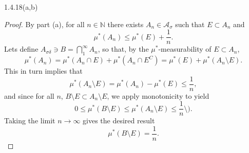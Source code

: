 \documentclass[11pt]{article}
\begin{document}
\begin{problem}{1.4.18(a,b)}
\begin{enumerate}[label=(\alph*)]
\begin{proof}
			      By part (a), for all \( n \in \mathbb{N} \) there exists \( A_n \in \mathcal{A}_{\sigma} \) such that \( E \subset A_n \) and
			      \begin{equation}
				      \label{eq:8}
				      \mu^{*}(A_n) \leq \mu^{*}(E) + \frac{1}{n}.
			      \end{equation}
			      Lets define \( A_{\sigma\delta} \ni B = \bigcap_1^{\infty} A_n \), so that, by the \(\mu^{*}\)-measurability of \( E \subset A_n \),
			      \begin{equation}
				      \label{eq:9}
				      \mu^{*}(A_n) = \mu^{*}(A_{n} \cap E) + \mu^{*}(A_{n} \cap E^C) = \mu^{*}(E) + \mu^{*}(A_{n} \setminus E).
			      \end{equation}
			      This in turn implies that
			      \begin{equation}
				      \label{eq:10}
				      \mu^{*}(A_{n} \setminus E) = \mu^{*}(A_n) - \mu^{*}(E) \leq \frac{1}{n},
			      \end{equation}
			      and since for all \( n \), \( B \setminus E \subset A_n \setminus E\), we apply monotonicity to yield
			      \begin{equation}
				      \label{eq:11}
				      0 \leq \mu^{*}(B \setminus E) \leq \mu^{*}(A_n \setminus E) \leq \frac{1}{n} \setminus).
			      \end{equation}
			      Taking the limit \( n \rightarrow \infty \) gives the desired result
			      \begin{equation}
				      \label{eq:12}
				      \mu^{*}(B \setminus E) = \frac{1}{n}.
			      \end{equation}
		      \end{proof}
	\end{enumerate}
\end{problem}
\end{document}
